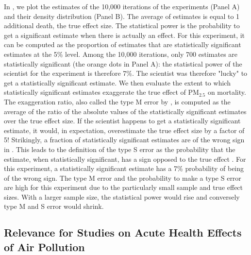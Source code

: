 \documentclass[12pt]{article}
\begin{document}
    In , we plot the estimates of the 10,000 iterations of the experiments (Panel A) and their density distribution (Panel B). The average of estimates is equal to 1 additional death, the true effect size. The statistical power is the probability to get a significant estimate when there is actually an effect. For this experiment, it can be computed as the proportion of estimates that are statistically significant estimates at the 5\% level. Among the 10,000 iterations, only 700 estimates are statistically significant (the orange dots in Panel A): the statistical power of the scientist for the experiment is therefore 7\%. The scientist was therefore "lucky" to get a statistically significant estimate. We then evaluate the extent to which statistically significant estimates exaggerate the true effect of PM$_{2.5}$ on mortality. The exaggeration ratio, also called the type M error by \cite{gelman_beyond_2014}, is computed as the average of the ratio of the absolute values of the statistically significant estimates over the true effect size. If the scientist happens to get a statistically significant estimate, it would, in expectation, overestimate the true effect size by a factor of 5! Strikingly, a fraction of statistically significant estimates are of the wrong sign in . This leads to the definition of the type S error as the probability that the estimate, when statistically significant, has a sign opposed to the true effect \citep{gelman_type_2000}. For this experiment, a statistically significant estimate has a 7\% probability of being of the wrong sign. The type M error and the probability to make a type S error are high for this experiment due to the particularly small sample and true effect sizes. With a larger sample size, the statistical power would rise and conversely type M and S error would shrink.
    
\subsection{Relevance for Studies on Acute Health Effects of Air Pollution}
\end{document}
